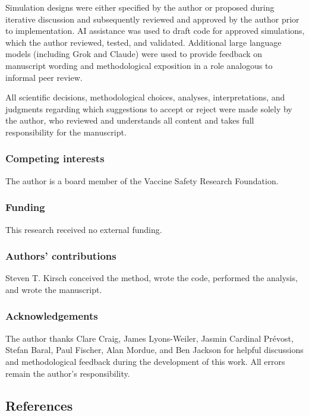 \documentclass[
]{article}
\begin{document}
Simulation designs were either specified by the author or proposed
during iterative discussion and subsequently reviewed and approved by
the author prior to implementation. AI assistance was used to draft code
for approved simulations, which the author reviewed, tested, and
validated. Additional large language models (including Grok and Claude)
were used to provide feedback on manuscript wording and methodological
exposition in a role analogous to informal peer review.

All scientific decisions, methodological choices, analyses,
interpretations, and judgments regarding which suggestions to accept or
reject were made solely by the author, who reviewed and understands all
content and takes full responsibility for the manuscript.

\subsubsection{Competing interests}\label{competing-interests}

The author is a board member of the Vaccine Safety Research Foundation.

\subsubsection{Funding}\label{funding}

This research received no external funding.

\subsubsection{Authors' contributions}\label{authors-contributions}

Steven T. Kirsch conceived the method, wrote the code, performed the
analysis, and wrote the manuscript.

\subsubsection{Acknowledgements}\label{acknowledgements}

The author thanks Clare Craig, James Lyons-Weiler, Jasmin Cardinal
Prévost, Stefan Baral, Paul Fischer, Alan Mordue, and Ben Jackson for
helpful discussions and methodological feedback during the development
of this work. All errors remain the author's responsibility.

\newpage

\subsection{References}\label{references}
\end{document}
